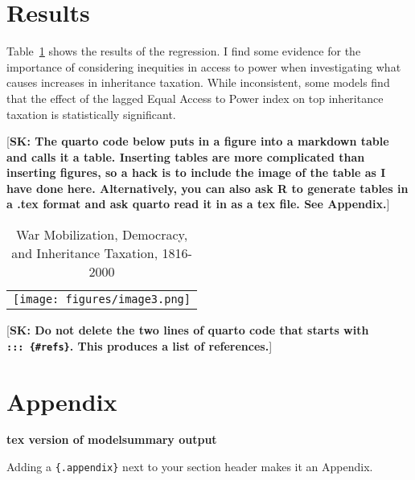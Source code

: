 \documentclass[12pt, ]{article}
\newenvironment{CSLReferences}[2]{

\clearpage
}{}
\begin{document}
\hypertarget{results}{%
\section{Results}\label{results}}

Table~\ref{tbl-main} shows the results of the regression. I find some
evidence for the importance of considering inequities in access to power
when investigating what causes increases in inheritance taxation. While
inconsistent, some models find that the effect of the lagged Equal
Access to Power index on top inheritance taxation is statistically
significant.

{[}\textbf{SK: The quarto code below puts in a figure into a markdown
table and calls it a table. Inserting tables are more complicated than
inserting figures, so a hack is to include the image of the table as I
have done here. Alternatively, you can also ask R to generate tables in
a .tex format and ask quarto read it in as a tex file. See Appendix.}{]}

\hypertarget{tbl-main}{}
\begin{longtable}[]{@{}l@{}}
\caption{\label{tbl-main}War Mobilization, Democracy, and Inheritance
Taxation, 1816-2000}\tabularnewline
\toprule\noalign{}
\endfirsthead
\endhead
\bottomrule\noalign{}
\endlastfoot
\texttt{[image: figures/image3.png]} \\
\end{longtable}

{[}\textbf{SK: Do not delete the two lines of quarto code that starts
with \texttt{:::\ \{\#refs\}}. This produces a list of references.}{]}

\hypertarget{refs}{}

\begin{CSLReferences}{0}{0}\end{CSLReferences}

\appendix

\hypertarget{appendix}{%
\section{Appendix}\label{appendix}}

\begin{table}
\caption{\textbf{tex version of modelsummary output}}


\end{table}

Adding a \texttt{\{.appendix\}} next to your section header makes it an
Appendix.
\end{document}
